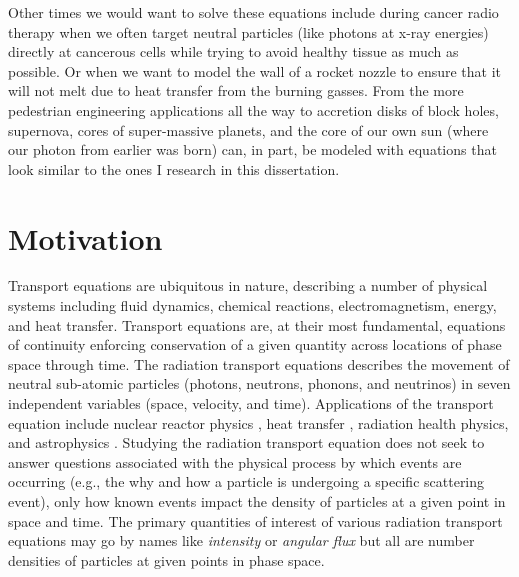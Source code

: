Other times we would want to solve these equations include during cancer radio therapy when we often target  neutral particles (like photons at x-ray energies) directly at cancerous cells while trying to avoid healthy tissue as much as possible.
Or when we want to model the wall of a rocket nozzle to ensure that it will not melt due to heat transfer from the burning gasses.
From the more pedestrian engineering applications all the way to accretion disks of block holes, supernova, cores of super-massive planets, and the core of our own sun (where our photon from earlier was born) can, in part, be modeled with equations that look similar to the ones I research in this dissertation.


\section{Motivation}

Transport equations are ubiquitous in nature, describing a number of physical systems including fluid dynamics, chemical reactions, electromagnetism, energy, and heat transfer.
Transport equations are, at their most fundamental, equations of continuity enforcing conservation of a given quantity across locations of phase space through time.
The radiation transport equations describes the movement of neutral sub-atomic particles (photons, neutrons, phonons, and neutrinos) in seven independent variables (space, velocity, and time).
Applications of the transport equation include nuclear reactor physics \cite{duderstadt_hamilton}, heat transfer \cite{radheattrans2003}, radiation health physics, and astrophysics \cite{chandrasekhar1960radiative}.
Studying the radiation transport equation does not seek to answer questions associated with the physical process by which events are occurring (e.g., the why and how a particle is undergoing a specific scattering event), only how known events impact the density of particles at a given point in space and time.
The primary quantities of interest of various radiation transport equations may go by names like \emph{intensity} or \emph{angular flux} but all are number densities of particles at given points in phase space.

